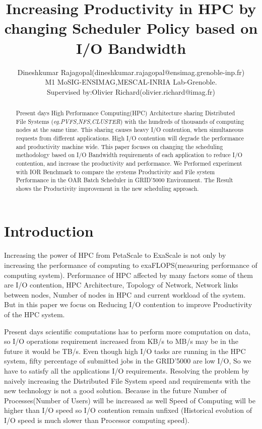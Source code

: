\documentclass{article}
\title{Increasing Productivity in HPC by changing Scheduler Policy based on I/O Bandwidth
}
\author{Dineshkumar Rajagopal(dineshkumar.rajagopal@ensimag.grenoble-inp.fr) \\ 
 M1 MoSIG-ENSIMAG,MESCAL-INRIA Lab-Grenoble.\\
Supervised by:Olivier Richard(olivier.richard@imag.fr)} %
\begin{document}
\maketitle
\begin{abstract}

Present days High Performance Computing(HPC) Architecture sharing Distributed File Systems ({\em eg.PVFS,NFS,CLUSTER})\cite{Distributed_File_System} with the hundreds of thousands of computing nodes at the same time. This sharing causes heavy I/O contention, when simultaneous requests from different applications. High I/O contention will degrade the performance and productivity machine wide. This paper focuses on changing the scheduling methodology based on I/O Bandwidth requirements of each application to reduce I/O contention, and increase the productivity and performance. We Performed experiment with IOR\cite{IOR_Description}\cite{IOR_Performance_measurement_in_File_System} Benchmark to compare the systems Productivity and File system Performance in the OAR\cite{inproceedingscapit.cd-cghmmnr_bswhlc_05} Batch Scheduler in GRID’5000\cite{Grid5000} Environment.  The Result shows the Productivity improvement in the new scheduling approach.

\end{abstract}
\section{Introduction}
\paragraph{}Increasing the power of HPC from PetaScale to ExaScale is not only by increasing the performance of computing to exaFLOPS(measuring performance of computing system). Performance of HPC affected by many factors some of them are I/O contention, HPC Architecture, Topology of Network, Network links between nodes, Number of nodes in HPC and current workload of the system. But in this paper we focus on Reducing I/O contention to improve Productivity of the HPC system.


Present days scientific computations has to perform more computation on data, so I/O operations requirement increased from KB/s to MB/s may be in the future it would be TB/s. Even though high I/O tasks are running in the HPC system, fifty percentage of submitted jobs in the GRID’5000 are low I/O\cite{lallouette:hal-00967106}, So we have to satisfy all the applications I/O requirements. Resolving the problem by naively increasing the  Distributed File System speed and requirements with the new technology is not a good solution. Because in the future Number of Processes(Number of Users) will be increased as well Speed of  Computing will be higher than I/O speed so I/O contention remain unfixed (Historical evolution of I/O speed is much slower than Processor computing speed).
\end{document}
